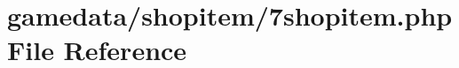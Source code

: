 \hypertarget{7shopitem_8php}{\section{gamedata/shopitem/7shopitem.php File Reference}
\label{7shopitem_8php}
}
